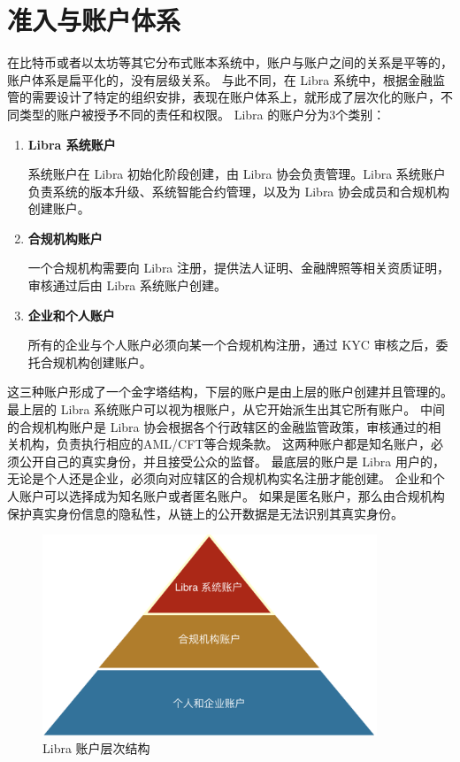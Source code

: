 \section{准入与账户体系}\label{sec:hierarchy}

在比特币或者以太坊等其它分布式账本系统中，账户与账户之间的关系是平等的，账户体系是扁平化的，没有层级关系。
与此不同，在 Libra 系统中，根据金融监管的需要设计了特定的组织安排，表现在账户体系上，就形成了层次化的账户，不同类型的账户被授予不同的责任和权限。
Libra 的账户分为3个类别：

\begin{enumerate}
    \item \textbf{Libra 系统账户}

        系统账户在 Libra 初始化阶段创建，由 Libra 协会负责管理。Libra 系统账户负责系统的版本升级、系统智能合约管理，以及为 Libra 协会成员和合规机构创建账户。
        
    \item \textbf{合规机构账户}

        一个合规机构需要向 Libra 注册，提供法人证明、金融牌照等相关资质证明，审核通过后由 Libra 系统账户创建。

    \item \textbf{企业和个人账户}
    
        所有的企业与个人账户必须向某一个合规机构注册，通过 KYC 审核之后，委托合规机构创建账户。
    
\end{enumerate}

这三种账户形成了一个金字塔结构，下层的账户是由上层的账户创建并且管理的。
最上层的 Libra 系统账户可以视为根账户，从它开始派生出其它所有账户。
中间的合规机构账户是 Libra 协会根据各个行政辖区的金融监管政策，审核通过的相关机构，负责执行相应的AML/CFT等合规条款。
这两种账户都是知名账户，必须公开自己的真实身份，并且接受公众的监督。
最底层的账户是 Libra 用户的，无论是个人还是企业，必须向对应辖区的合规机构实名注册才能创建。
企业和个人账户可以选择成为知名账户或者匿名账户。
如果是匿名账户，那么由合规机构保护真实身份信息的隐私性，从链上的公开数据是无法识别其真实身份。

\begin{figure}[h!]
    \centering
    \includegraphics[width=10cm, keepaspectratio]{images/ledger_hierarchy.png}
    \caption{Libra 账户层次结构}
    \label{fig:hierarchy}
\end{figure}

